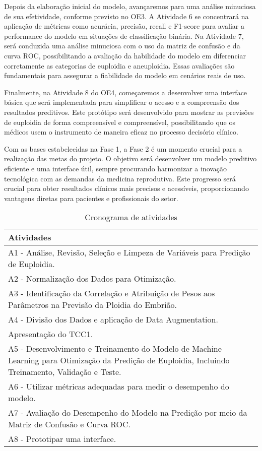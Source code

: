 Depois da elaboração inicial do modelo, avançaremos para uma análise minuciosa de sua efetividade, conforme previsto no OE3. A Atividade 6 se concentrará na aplicação de métricas como acurácia, precisão, recall e F1-score para avaliar a performance do modelo em situações de classificação binária. Na Atividade 7, será conduzida uma análise minuciosa com o uso da matriz de confusão e da curva ROC, possibilitando a avaliação da habilidade do modelo em diferenciar corretamente as categorias de euploidia e aneuploidia. Essas avaliações são fundamentais para assegurar a fiabilidade do modelo em cenários reais de uso.

Finalmente, na Atividade 8 do OE4, começaremos a desenvolver uma interface básica que será implementada para simplificar o acesso e a compreensão dos resultados preditivos. Este protótipo será desenvolvido para mostrar as previsões de euploidia de forma compreensível e compreensível, possibilitando que os médicos usem o instrumento de maneira eficaz no processo decisório clínico. 

Com as bases estabelecidas na Fase 1, a Fase 2 é um momento crucial para a realização das metas do projeto. O objetivo será desenvolver um modelo preditivo eficiente e uma interface útil, sempre procurando harmonizar a inovação tecnológica com as demandas da medicina reprodutiva. Este progresso será crucial para obter resultados clínicos mais precisos e acessíveis, proporcionando vantagens diretas para pacientes e profissionais do setor.

\begin{landscape}
\begin{table}[ht]
    \centering
    \caption{Cronograma de atividades}
    \begin{tabular}{|l|}
    \hline
    \textbf{Atividades} \\ \hline
    A1 - Análise, Revisão, Seleção e Limpeza de Variáveis para Predição de Euploidia. \\ \hline
    A2 - Normalização dos Dados para Otimização. \\ \hline
    A3 - Identificação da Correlação e Atribuição de Pesos aos Parâmetros na Previsão da Ploidia do Embrião. \\ \hline
    A4 - Divisão dos Dados e aplicação de Data Augmentation. \\ \hline
    Apresentação do TCC1. \\ \hline
    A5 - Desenvolvimento e Treinamento do Modelo de Machine Learning para Otimização da Predição de Euploidia, Incluindo Treinamento, Validação e Teste. \\ \hline
    A6 - Utilizar métricas adequadas para medir o desempenho do modelo. \\ \hline
    A7 - Avaliação do Desempenho do Modelo na Predição por meio da Matriz de Confusão e Curva ROC. \\ \hline
    A8 - Prototipar uma interface. \\ \hline
    \end{tabular}
    \label{tab:cronograma}
\end{table}
\end{landscape}

